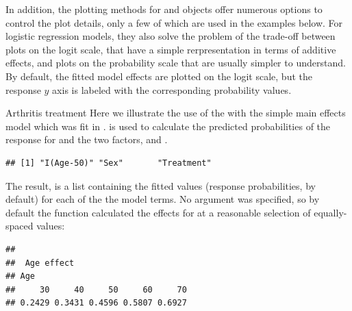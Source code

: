 \documentclass[11pt]{book}
\renewenvironment{knitrout}{\small\renewcommand{\baselinestretch}{.85}}{} %
\begin{document}
In addition, the plotting methods for  and  objects offer
numerous options to control the plot details, only a few of which are used in the
examples below. For logistic regression models, they also solve the problem of
the trade-off between plots on the logit scale, that have a simple rerpresentation
in terms of additive effects, and plots on the probability scale that are
usually simpler to understand.  By default, the fitted model effects are 
plotted on the logit scale, but the response $y$ axis is labeled with 
the corresponding probability values.

\begin{Example}{Arthritis treatment}
Here we illustrate the use of the  with the simple main effects
model which was fit in .   is used to 
calculate the predicted probabilities of the  response for
 and the two factors,  and . 
\begin{knitrout}
\color{fgcolor}\begin{kframe}
\begin{alltt}
 \hlkwb{<-} 
\end{alltt}
\begin{verbatim}
## [1] "I(Age-50)" "Sex"       "Treatment"
\end{verbatim}
\end{kframe}
\end{knitrout}
The result,  is a list containing the fitted values (response probabilities, by default)
for each of the the model terms. No  argument was specified, so by default
the function calculated the effects for  at a reasonable selection of equally-spaced
values:
\begin{knitrout}
\color{fgcolor}\begin{kframe}
\begin{alltt}
\hlstd{arth.eff2[[}\hlstd{]]}
\end{alltt}
\begin{verbatim}
## 
##  Age effect
## Age
##     30     40     50     60     70 
## 0.2429 0.3431 0.4596 0.5807 0.6927
\end{verbatim}
\end{kframe}
\end{knitrout}

\end{Example}
\end{document}
